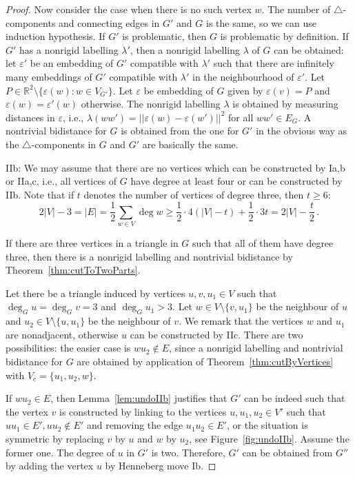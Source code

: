 \documentclass[a4paper, 11pt]{article}
\newcommand{\trcomps}{$\triangle$-components}
\newcommand{\RR}{\mathbb{R}}
\theoremstyle{definition}
\begin{document}
\begin{proof}
Now consider the case when there is no such vertex $w$. The number of \trcomps{} and connecting edges in $G'$ and $G$ is the same, so we can use induction hypothesis. If $G'$ is problematic, then $G$ is problematic by definition. If $G'$ has a nonrigid labelling $\lambda'$, then a nonrigid labelling $\lambda$ of $G$ can be obtained: let $\varepsilon'$ be an embedding of $G'$ compatible with $\lambda'$ such that there are infinitely many embeddings of $G'$ compatible with $\lambda'$ in the neighbourhood of $\varepsilon'$. Let $P\in\RR^2\setminus\{\varepsilon(w)\colon w\in V_{G'}\}$. Let $\varepsilon$ be embedding of $G$ given by $\varepsilon(v)=P$ and $\varepsilon(w)=\varepsilon'(w)$ otherwise. The nonrigid labelling $\lambda$ is obtained by measuring distances in $\varepsilon$, i.e., $\lambda(ww')=||\varepsilon(w)-\varepsilon(w')||^2$ for all $ww'\in E_G$.
A nontrivial bidistance for $G$ is obtained from the one for $G'$ in the obvious way as the \trcomps{} in $G$ and $G'$ are basically the same.

IIb: We may assume that there are no vertices which can be constructed by Ia,b or IIa,c, i.e., all vertices of $G$ have degree at least four or can be constructed by IIb. Note that if $t$ denotes the number of vertices of degree three, then $t\geq 6$:
$$
2|V|-3=|E|=\frac{1}{2} \sum_{w\in V} \deg w\geq \frac{1}{2}\cdot 4(|V|-t)+\frac{1}{2}\cdot 3 t=2|V|-\frac{t}{2}\,.
$$

If there are three vertices in a triangle in $G$ such that all of them have degree three, then there is a nonrigid labelling and nontrivial bidistance by Theorem~\ref{thm:cutToTwoParts}.

Let there be a triangle induced by vertices $u,v, u_1\in V$ such that $\deg_G u =\deg_G v=3$ and $\deg_G u_1>3$. Let $w\in V\setminus \{v, u_1\}$ be the neighbour of $u$ and $u_2\in V\setminus \{u, u_1\}$ be the neighbour of $v$. We remark that the vertices $w$ and $u_1$ are nonadjacent, otherwise $u$ can be constructed by IIc. There are two possibilities: the easier case is  $wu_2\notin E$, since  a nonrigid labelling and nontrivial bidistance for $G$ are obtained by application of Theorem~\ref{thm:cutByVertices} with $V_c=\{u_1,u_2,w\}$. 

If $wu_2\in E$, then Lemma~\ref{lem:undoIIb} justifies that $G'$ can be indeed such that the vertex $v$ is constructed by linking to the vertices $u,u_1,u_2 \in V'$ such that $uu_1\in E',uu_2\notin E'$ and removing the edge $u_1u_2\in E'$, or the situation is symmetric by replacing $v$ by $u$ and $w$ by $u_2$, see Figure~\ref{fig:undoIIb}. Assume the former one. The degree of $u$ in $G'$ is two. Therefore, $G'$ can be obtained from $G''$ by adding the vertex $u$ by Henneberg move Ib. 


\end{proof}
\end{document}
